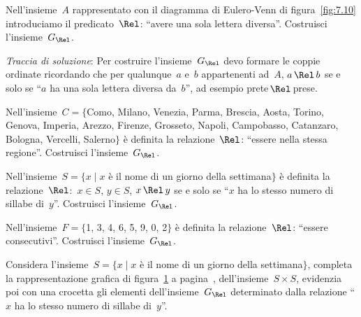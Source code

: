 \begin{esercizio}
\label{ese:7.3}
Nell'insieme~$A$ rappresentato con il diagramma di Eulero-Venn di figura~\ref{fig:7.10} introduciamo il predicato~$\Rel$: ``avere
una sola lettera diversa''. Costruisci l'insieme~$G_\Rel$.

\begin{figure}[b]
\begin{minipage}[b]{.45\textwidth}
 \centering
 
 \caption{}\label{fig:7.10}
\end{minipage}\hfil
\begin{minipage}[b]{.45\textwidth}
 \centering
 
 \caption{}\label{fig:7.11}
\end{minipage}
\end{figure}

\emph{Traccia di soluzione}:
Per costruire l'insieme~$G_\Rel$ devo formare le coppie ordinate ricordando che per qualunque~$a$ e~$b$ appartenenti ad~$A$, $a \,\Rel\, b$
se e solo se ``$a$ ha una sola lettera diversa da~$b$'', ad esempio prete$\,\Rel\,$prese.
\end{esercizio}

\begin{esercizio}
\label{ese:7.4}
Nell'insieme~$C = \{$Como, Milano, Venezia, Parma, Brescia, Aosta, Torino, Genova, Imperia, Arezzo,
Firenze, Grosseto, Napoli, Campobasso, Catanzaro, Bologna, Vercelli, Salerno$\}$ è definita la
relazione~$\Rel$: ``essere nella stessa regione''. Costruisci l'insieme~$G_\Rel$.
\end{esercizio}

\begin{esercizio}
\label{ese:7.5}
Nell'insieme~$S = \{ x \mid  x$ è il nome di un giorno della settimana$\}$ è definita la
relazione~$\Rel$:~$x \in S$, $y \in S$, $x \,\Rel\, y$ se e solo se ``$x$ ha
lo stesso numero di sillabe di~$y$''. Costruisci l'insieme~$G_\Rel$.
\end{esercizio}

\begin{esercizio}
\label{ese:7.6}
Nell'insieme~$F = \{$1, 3, 4, 6, 5, 9, 0, 2$\}$ è definita la relazione~$\Rel$: ``essere consecutivi''. Costruisci l'insieme~$G_\Rel$.
\end{esercizio}

 \begin{esercizio}
\label{ese:7.7}
Considera l'insieme~$S = \{ x \mid  x$ è il nome di un giorno della settimana$\}$, completa la rappresentazione grafica di figura~\ref{fig:7.11} a pagina~\pageref{fig:7.11}, dell'insieme~$S \times S$,
evidenzia poi con una crocetta gli elementi dell'insieme~$G_\Rel$ determinato dalla relazione ``$x$ ha lo stesso numero di sillabe di~$y$''.
\end{esercizio}

